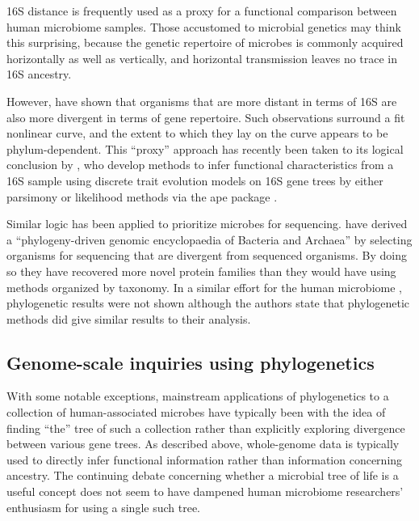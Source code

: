 \documentclass{amsart}
\begin{document}
16S distance is frequently used as a proxy for a functional comparison between human microbiome samples.
Those accustomed to microbial genetics may think this surprising, because the genetic repertoire of microbes is commonly acquired horizontally as well as vertically, and horizontal transmission leaves no trace in 16S ancestry.

However, \citet{zaneveld2010ribosomal} have shown that organisms that are more distant in terms of 16S are also more divergent in terms of gene repertoire.
Such observations surround a fit nonlinear curve, and the extent to which they lay on the curve appears to be phylum-dependent.
This ``proxy'' approach has recently been taken to its logical conclusion by \citet{langille2013predictive}, who develop methods to infer functional characteristics from a 16S sample using discrete trait evolution models on 16S gene trees by either parsimony \citep{kluge1969quantitative} or likelihood \citep{pagel1994detecting} methods via the ape package \citep{paradis2004ape}.

Similar logic has been applied to prioritize microbes for sequencing.
\citet{wu2009phylogeny} have derived a ``phylogeny-driven genomic encyclopaedia of Bacteria and Archaea'' by selecting organisms for sequencing that are divergent from sequenced organisms.
By doing so they have recovered more novel protein families than they would have using methods organized by taxonomy.
In a similar effort for the human microbiome \citep{fodor2012most}, phylogenetic results were not shown although the authors state that phylogenetic methods did give similar results to their analysis.


\subsection{Genome-scale inquiries using phylogenetics}
With some notable exceptions, mainstream applications of phylogenetics to a collection of human-associated microbes have typically been with the idea of finding ``the'' tree of such a collection rather than explicitly exploring divergence between various gene trees.
As described above, whole-genome data is typically used to directly infer functional information rather than information concerning ancestry.
The continuing debate concerning whether a microbial tree of life is a useful concept \citep{bapteste2009prokaryotic,caro2012bacterial} does not seem to have dampened human microbiome researchers' enthusiasm for using a single such tree.
\end{document}
